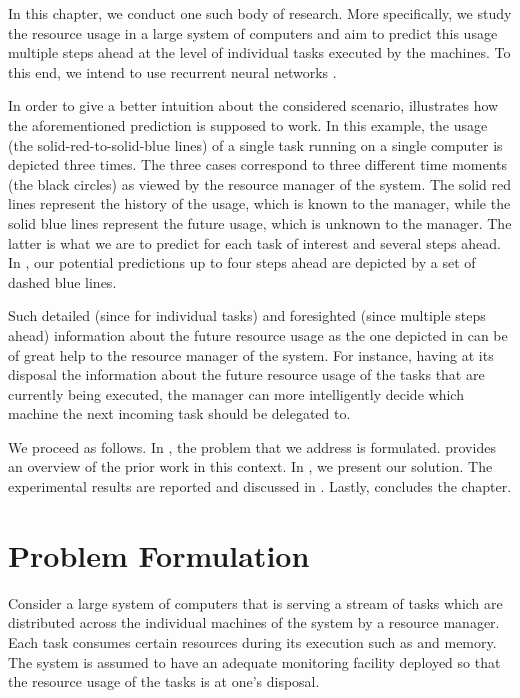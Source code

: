 In this chapter, we conduct one such body of research. More specifically, we
study the resource usage in a large system of computers and aim to predict this
usage multiple steps ahead at the level of individual tasks executed by the
machines. To this end, we intend to use recurrent neural networks
\cite{goodfellow2016}.

In order to give a better intuition about the considered scenario,
 illustrates how the aforementioned prediction is supposed
to work. In this example, the  usage (the solid-red-to-solid-blue lines)
of a single task running on a single computer is depicted three times. The three
cases correspond to three different time moments (the black circles) as viewed
by the resource manager of the system. The solid red lines represent the history
of the usage, which is known to the manager, while the solid blue lines
represent the future usage, which is unknown to the manager. The latter is what
we are to predict for each task of interest and several steps ahead. In
, our potential predictions up to four steps ahead are
depicted by a set of dashed blue lines.

Such detailed (since for individual tasks) and foresighted (since multiple steps
ahead) information about the future resource usage as the one depicted in
 can be of great help to the resource manager of the
system. For instance, having at its disposal the information about the future
resource usage of the tasks that are currently being executed, the manager can
more intelligently decide which machine the next incoming task should be
delegated to.

We proceed as follows. In , the problem that we address is
formulated.  provides an overview of the prior work in this
context. In , we present our solution. The experimental
results are reported and discussed in . Lastly,
 concludes the chapter.

\section{Problem Formulation}

Consider a large system of computers that is serving a stream of tasks which are
distributed across the individual machines of the system by a resource manager.
Each task consumes certain resources during its execution such as  and
memory. The system is assumed to have an adequate monitoring facility deployed
so that the resource usage of the tasks is at one's disposal.

